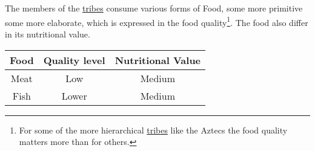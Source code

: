 \section{}\label{ch:Goods:Food}

The members of the \hyperref[ch:Tribes]{tribes} consume various forms of
\gls*{Food}, some more primitive some more elaborate, which is expressed in the
food quality\footnote{ For some of the more hierarchical
	\hyperref[ch:Tribes]{tribes} like the \gls{Aztecs} the food quality matters more
	than for others. }. The food also differ in its nutritional value.


\begin{longtable}{ccc}
	\toprule
	\Gls*{Food} & Quality level & Nutritional Value \\
	\midrule
	\Gls{Meat}  & Low           & Medium            \\
	\Gls{Fish}  & Lower         & Medium            \\
	\bottomrule
\end{longtable}

